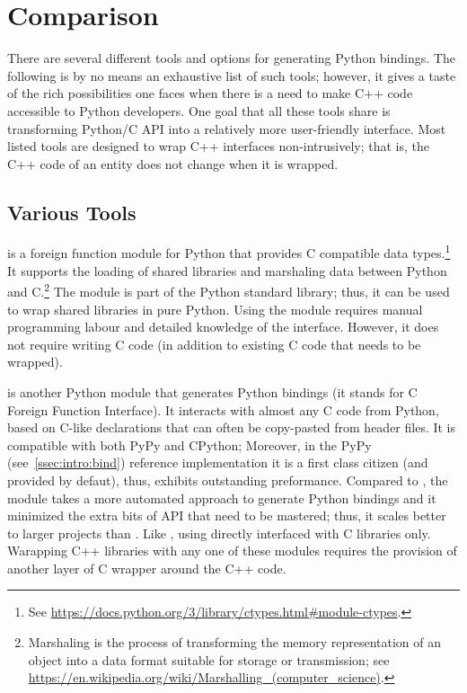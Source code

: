 \section{Comparison}
\label{sec:comp}
There are several different tools and options for generating Python
bindings.  The following is by no means an exhaustive list of such
tools; however, it gives a taste of the rich possibilities one faces
when there is a need to make C++ code accessible to Python developers.
One goal that all these tools share is transforming Python/C API
into a relatively more user-friendly interface.
Most listed tools are designed to wrap C++ interfaces non-intrusively;
that is, the C++ code of an entity does not change when it is wrapped.

\subsection{Various Tools}
\label{ssec:comp:tools}
 is a foreign function module for Python that
provides C compatible data
types.\footnote{See \url{https://docs.python.org/3/library/ctypes.html\#module-ctypes}.}
It supports the loading of shared libraries and marshaling data
between Python and C.\footnote{Marshaling is the process of
transforming the memory representation of an object into a data format
suitable for storage or transmission; see
\url{https://en.wikipedia.org/wiki/Marshalling\_(computer\_science)}.}
The  module is part of the Python standard
library; thus, it can be used to wrap shared libraries in pure Python.
Using the  module requires manual programming
labour and detailed knowledge of the 
interface. However, it does not require writing C code (in addition to
existing C code that needs to be wrapped).

 is another Python module that generates Python
bindings (it stands for C Foreign Function Interface). It interacts
with almost any C code from Python, based on C-like declarations that
can often be copy-pasted from header files. It is compatible with both
PyPy and CPython; Moreover, in the PyPy (see~\ref{ssec:intro:bind})
reference implementation it is a first class citizen (and provided by
defaut), thus, exhibits outstanding preformance. Compared
to , the  module takes a more
automated approach to generate Python bindings and it minimized the
extra bits of API that need to be mastered; thus, it scales better to
larger projects than . Like ,
using  directly interfaced with C libraries
only. Warapping C++ libraries with any one of these modules requires
the provision of another layer of C wrapper around the C++ code.

